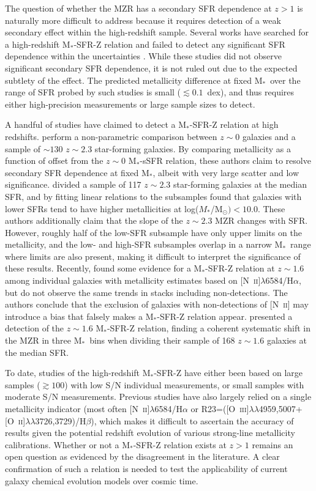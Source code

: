 \documentclass[iop,twocolappendix]{emulateapj}
\newcommand{\mstar}{$\mbox{M}_*$}
\newcommand{\ii}{~\textsc{ii}}
\newcommand{\iii}{~\textsc{iii}}
\begin{document}
The question of whether the MZR has a secondary SFR dependence at $z>1$ is naturally more difficult
 to address because it requires detection of a weak secondary effect within the high-redshift sample.
  Several works have searched for a high-redshift \mstar-SFR-Z relation and failed to detect any
 significant SFR dependence within the uncertainties \citep{wuy12,wuy14,wuy16,ste14,yab14,yab15,san15,gra16}.
  While these studies did not observe significant secondary SFR dependence, it is not ruled out due to the
 expected subtlety of the effect.
  The predicted metallicity difference at fixed \mstar\ over the range of SFR probed by such studies
 is small ($\lesssim0.1$~dex), and thus requires either high-precision measurements or large sample sizes to detect.

A handful of studies have claimed to detect a \mstar-SFR-Z relation at high redshifts.
  \citet{sal15} perform a non-parametric comparison between $z\sim0$ galaxies and a sample of
 $\sim130$ $z\sim2.3$ star-forming galaxies.  By comparing metallicity as a function of offset from
 the $z\sim0$ \mstar-sSFR relation, these authors claim to resolve secondary SFR dependence at fixed \mstar,
 albeit with very large scatter and low significance.
  \citet{kac16} divided a sample of 117 $z\sim2.3$ star-forming galaxies at the median SFR, and by fitting
 linear relations to the subsamples found that galaxies with lower SFRs tend to have higher metallicities
 at log($M_*$/M$_{\odot})<10.0$.
  These authors additionally claim that the slope of the $z\sim2.3$ MZR changes with SFR.
  However, roughly half of the low-SFR subsample have only upper limits on the metallicity, and the low-
 and high-SFR subsamples overlap in a narrow \mstar\ range where limits are also present, making it difficult
 to interpret the significance of these results.
  Recently, \citet{kas17} found some evidence for a \mstar-SFR-Z relation at $z\sim1.6$ among individual
 galaxies with metallicity estimates based on [N\ii]$\lambda$6584/H$\alpha$, but do not observe the
 same trends in stacks including non-detections.  The authors conclude that the exclusion of galaxies with non-detections
 of [N\ii] may introduce a bias that falsely makes a \mstar-SFR-Z relation appear.
  \citet{zah14b} presented a detection of the $z\sim1.6$ \mstar-SFR-Z relation, finding a coherent systematic
 shift in the MZR in three \mstar\ bins when dividing their sample of 168 $z\sim1.6$ galaxies at the median SFR.

To date, studies of the high-redshift \mstar-SFR-Z have either been based on
 large samples ($\gtrsim100$) with low S/N individual measurements, or small samples with moderate S/N measurements.
  Previous studies have also largely relied on a single metallicity indicator (most often
 [N\ii]$\lambda$6584/H$\alpha$ or R23=([O\iii]$\lambda\lambda$4959,5007+[O\ii]$\lambda\lambda$3726,3729)/H$\beta$),
 which makes it difficult to ascertain the accuracy of results given the potential redshift evolution
 of various strong-line metallicity calibrations.
  Whether or not a \mstar-SFR-Z relation exists at $z>1$ remains an open question as evidenced by
 the disagreement in the literature.  A clear confirmation of such a relation is needed to test the
 applicability of current galaxy chemical evolution models over cosmic time.
\end{document}
